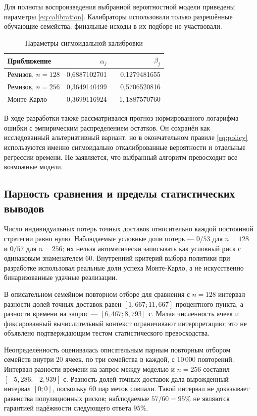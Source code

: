 Для полноты воспроизведения выбранной вероятностной модели приведены параметры \eqref{eq:calibration}. Калибраторы использовали только разрешённые обучающие семейства; финальные исходы в их подборе не участвовали.
\begin{table}[!ht]\centering\caption{Параметры сигмоидальной калибровки}\label{tab:calibration}
\begin{tabular}{lrr}\toprule Приближение&$\alpha_j$&$\beta_j$\\\midrule
Ремизов, $n=128$&0,6887102701&0,1279481655\\
Ремизов, $n=256$&0,3649140499&0,5706520816\\
Монте-Карло&0,3699116924&$-1{,}1887570760$\\\bottomrule\end{tabular}\end{table}
В ходе разработки также рассматривался прогноз нормированного логарифма ошибки с эмпирическим распределением остатков. Он сохранён как исследованный альтернативный вариант, но в окончательном правиле \eqref{eq:policy} используются именно сигмоидально откалиброванные вероятности и отдельные регрессии времени. Не заявляется, что выбранный алгоритм превосходит все возможные модели.

\subsection*{Парность сравнения и пределы статистических выводов}
Число индивидуальных потерь точных доставок относительно каждой постоянной стратегии равно нулю. Наблюдаемые условные доли потерь --- $0/53$ для $n=128$ и $0/57$ для $n=256$; их нельзя автоматически записывать как условный риск с одинаковым знаменателем 60. Внутренний критерий выбора политики при разработке использовал реальные доли успеха Монте-Карло, а не искусственно бинаризованные удачные реализации.

В описательном семейном повторном отборе для сравнения с $n=128$ интервал разности долей точных доставок равен $[1{,}667;11{,}667]$ процентного пункта, а разности времени на запрос --- $[6{,}467;8{,}793]$ с. Малая численность ячеек и фиксированный вычислительный контекст ограничивают интерпретацию; это не объявлено подтверждающим тестом статистического превосходства.

Неопределённость оценивалась описательным парным повторным отбором семейств внутри 20 ячеек, по три семейства в каждой, с 10\,000 повторений. Интервал разности времени на запрос между моделью и $n=256$ составил $[-5{,}286;-2{,}939]$ с. Разность долей точных доставок дала вырожденный интервал $[0;0]$, поскольку 60 пар меток совпали. Такой интервал не доказывает равенства популяционных рисков; наблюдаемые $57/60=95\%$ не являются гарантией надёжности следующего ответа $95\%$.


